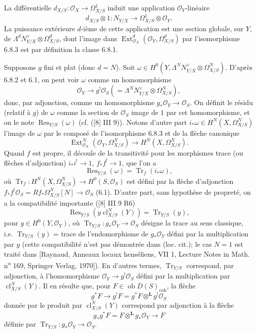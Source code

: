 \documentclass[11pt]{article}
\DeclareMathOperator{\Ext}{Ext}
\newcommand{\ob}{\operatorname{ob}}
\providecommand{\cl}{\operatorname{cl}}
\providecommand{\OO}{\mathcal{O}}
\providecommand{\LL}{\mathbf L}
\providecommand{\coh}{\mathrm{coh}}
\providecommand{\ob}{\operatorname{ob}}
\providecommand{\cl}{\operatorname{cl}}
\providecommand{\coh}{\mathrm{coh}}
\begin{document}
La différentielle $d_{X/S}:\OO_X\to\Omega^1_{X/S}$ induit une application $\OO_Y$-linéaire
\[
d_{X/S}\otimes 1:N_{Y/X}\longrightarrow \Omega^1_{X/S}\otimes\OO_Y.
\]
La puissance extérieure $d$-ième de cette application est une section globale, sur $Y$, de $\Lambda^d N_{Y/X}^{\vee}\otimes\Omega^d_{X/S}$, dont l'image dans $\Ext^d_{\OO_X}(\OO_Y,\Omega^d_{X/S})$ par l'isomorphisme 6.8.3 est par définition la classe 6.8.1.

Supposons $g$ fini et plat (donc $d=N$). Soit $\omega\in H^0(Y,\Lambda^N N_{Y/X}^{\vee}\otimes\Omega^N_{X/S})$. D'après 6.8.2 et 6.1, on peut voir $\omega$ comme un homomorphisme
\[
\OO_Y\longrightarrow g^!\OO_S(=\Lambda^N N_{Y/X}^{\vee}\otimes\Omega^N_{X/S}),
\]
donc, par adjonction, comme un homomorphisme $g_*\OO_Y\to\OO_S$. On définit le résidu (relatif à $g$) de $\omega$ comme la section de $\OO_S$ image de $1$ par cet homomorphisme, et on le note $\operatorname{Res}_{Y/S}(\omega)$ (cf. ([8] III 9)). Notons d'autre part $i_*\omega\in H^N(X,\Omega^N_{X/S})$ l'image de $\omega$ par le composé de l'isomorphisme 6.8.3 et de la flèche canonique
\[
\Ext^N_{\OO_X}(\OO_Y,\Omega^N_{X/S})\longrightarrow H^N(X,\Omega^N_{X/S}).
\]
Quand $f$ est propre, il découle de la transitivité pour les morphismes trace (ou flèches d'adjonction) $i_*i^!\to 1$, $f_*f^!\to 1$, que l'on a
\begin{equation}
\tag{6.8.4}
\operatorname{Res}_{Y/S}(\omega)=\operatorname{Tr}_f(i_*\omega),
\end{equation}
où $\operatorname{Tr}_f:H^N(X,\Omega^N_{X/S})\to H^0(S,\OO_S)$ est défini par la flèche d'adjonction $f_*f^!\OO_S=Rf_*\Omega^N_{X/S}[N]\to\OO_S$ (6.1). D'autre part, sans hypothèse de propreté, on a la compatibilité importante ([8] III 9 R6)
\begin{equation}
\tag{6.8.5}
\operatorname{Res}_{Y/S}(y\cl^N_{X/S}(Y))=\operatorname{Tr}_{Y/S}(y),
\end{equation}
pour $y\in H^0(Y,\OO_Y)$, où $\operatorname{Tr}_{Y/S}:g_*\OO_Y\to\OO_S$ désigne la trace au sens classique, i.e. $\operatorname{Tr}_{Y/S}(y)$ = trace de l'endomorphisme de $g_*\OO_Y$ défini par la multiplication par $y$ (cette compatibilité n'est pas démontrée dans (loc. cit.); le cas $N=1$ est traité dans [Raynaud, Anneaux locaux henséliens, VII 1, Lecture Notes in Math. n\textsuperscript{o} 169, Springer Verlag, 1970]). En d'autres termes, $\operatorname{Tr}_{Y/S}$ correspond, par adjonction, à l'homomorphisme $\OO_Y\to g^!\OO_S$ défini par la multiplication par $\cl^N_{X/S}(Y)$. Il en résulte que, pour $F\in\ob D(S)_{\coh}$, la flèche
\begin{equation}
\tag{6.8.6}
g^*F\longrightarrow g^!F=g^*F\otimes^{\LL}g^!\OO_S
\end{equation}
donnée par le produit par $\cl^N_{X/S}(Y)$ correspond par adjonction à la flèche
\begin{equation}
\tag{6.8.7}
g_*g^*F=F\otimes^{\LL}g_*\OO_Y\longrightarrow F
\end{equation}
définie par $\operatorname{Tr}_{Y/S}:g_*\OO_Y\to\OO_S$.
\end{document}
